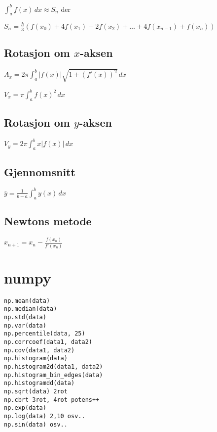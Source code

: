 \documentclass[a4paper,7pt,fleqn]{article}
\begin{document}
\(\int_{a}^{b} f(x) \,dx \approx S_n\) der  

\( S_n = \frac{h}{3} \left( f(x_0) + 4f(x_1) + 2f(x_2) + \dots + 4f(x_{n-1}) + f(x_n) \right) \)  

\subsection{Rotasjon om \(x\)-aksen}  

\( A_x = 2\pi \int_{a}^{b} |f(x)| \sqrt{1 + (f'(x))^2} \,dx \)  

\( V_x = \pi \int_{a}^{b} f(x)^2 \,dx \)  

\subsection{Rotasjon om \(y\)-aksen}  

\( V_y = 2\pi \int_{a}^{b} x |f(x)| \,dx \)  

\subsection{Gjennomsnitt}  

\( \bar{y} = \frac{1}{b-a} \int_{a}^{b} y(x) \,dx \)  

\subsection{Newtons metode}  

\( x_{n+1} = x_n - \frac{f(x_n)}{f'(x_n)} \)  



\newpage

\section{numpy}
\verb|np.mean(data)| \\
\verb|np.median(data)| \\
\verb|np.std(data)| \\
\verb|np.var(data)| \\
\verb|np.percentile(data, 25)| \\
\verb|np.corrcoef(data1, data2)| \\
\verb|np.cov(data1, data2)| \\
\verb|np.histogram(data)| \\
\verb|np.histogram2d(data1, data2)| \\
\verb|np.histogram_bin_edges(data)| \\
\verb|np.histogramdd(data)| \\
\verb|np.sqrt(data) 2rot| \\
\verb|np.cbrt 3rot, 4rot potens++| \\
\verb|np.exp(data)| \\
\verb|np.log(data) 2,10 osv.. |\\
\verb|np.sin(data) osv..| \\
\end{document}

